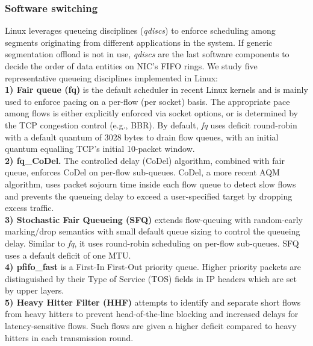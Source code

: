 \subsubsection{Software switching}
\label{sec:qdisc}
Linux leverages queueing disciplines (\textit{qdiscs}) to enforce scheduling among segments originating from different applications in the system. If generic segmentation offload is not in use, \textit{qdiscs} are the last software components to decide the order of data entities on NIC's FIFO rings.
We study five representative queueing disciplines implemented in Linux:
\\
\textbf{1) Fair queue (fq)} is the default scheduler in recent Linux kernels and is mainly used to enforce pacing on a per-flow (per socket) basis. The appropriate pace among flows is either explicitly enforced via socket options, or is determined by the TCP congestion control (e.g., BBR). By default, \textit{fq} uses deficit round-robin with a default quantum of 3028 bytes to drain flow queues, with an initial quantum equalling TCP's initial 10-packet window.
\\
\textbf{2) fq\_CoDel.} The controlled delay (CoDel) algorithm, combined with fair queue, enforces CoDel on per-flow sub-queues. CoDel, a more recent AQM algorithm, uses packet sojourn time inside each flow queue to detect slow flows and prevents the queueing delay to exceed a user-specified target by dropping excess traffic.
\\
\textbf{3) Stochastic Fair Queueing (SFQ)} extends flow-queuing with random-early marking/drop semantics with small default queue sizing to control the queueing delay. Similar to \textit{fq}, it uses round-robin scheduling on per-flow sub-queues. SFQ uses a default deficit of one MTU.
\\
\textbf{4) pfifo\_fast} is a First-In First-Out priority queue. Higher priority packets are distinguished by their Type of Service (TOS) fields in IP headers which are set by upper layers.
\\
\textbf{5) Heavy Hitter Filter (HHF)} attempts to identify and separate short flows from heavy hitters to prevent head-of-the-line blocking and increased delays for latency-sensitive flows. Such flows are given a higher deficit compared to heavy hitters in each transmission round.

